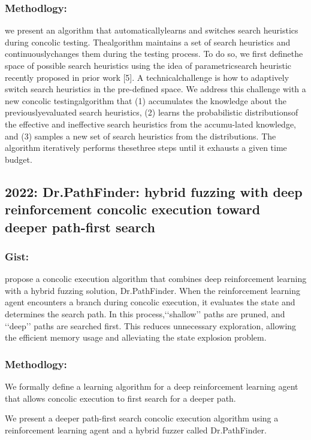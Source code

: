 \documentclass[	runningheads,
				a4paper]{llncs}
\begin{document}
\subsubsection{Methodlogy:}
we present an algorithm that automaticallylearns and switches search heuristics during concolic testing. Thealgorithm maintains a set of search heuristics and continuouslychanges them during the testing process. To do so, we first definethe space of possible search heuristics using the idea of parametricsearch heuristic recently proposed in prior work [5]. A technicalchallenge is how to adaptively switch search heuristics in the pre-defined space. We address this challenge with a new concolic testingalgorithm that (1) accumulates the knowledge about the previouslyevaluated search heuristics, (2) learns the probabilistic distributionsof the effective and ineffective search heuristics from the accumu-lated knowledge, and (3) samples a new set of search heuristics from the distributions. The algorithm iteratively performs thesethree steps until it exhausts a given time budget.

\subsection{2022: Dr.PathFinder: hybrid fuzzing with deep reinforcement concolic
execution toward deeper path-first search}

\subsubsection{Gist:}
propose a concolic execution algorithm that combines deep reinforcement learning with a hybrid fuzzing
solution, Dr.PathFinder. When the reinforcement learning agent encounters a branch during concolic execution, it evaluates the state and determines the search path. In this process,‘‘shallow’’ paths are pruned, and ‘‘deep’’ paths are searched
first. This reduces unnecessary exploration, allowing the efficient memory usage and alleviating the state explosion
problem.

\subsubsection{Methodlogy:}
We formally define a learning algorithm for a deep
reinforcement learning agent that allows concolic
execution to first search for a deeper path.

We present a deeper path-first search concolic execution algorithm using a reinforcement learning agent and
a hybrid fuzzer called Dr.PathFinder.
\end{document}
